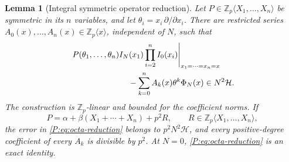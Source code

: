 \documentclass[11pt,a4paper]{article}
\newtheorem{lemma}[theorem]{Lemma}
\theoremstyle{definition}\newtheorem{definition}[theorem]{Definition}
\theoremstyle{remark}\newtheorem{remark}[theorem]{Remark}
\numberwithin{equation}{section}
\begin{document}
\begin{lemma}[Integral symmetric operator reduction]
\label{P:lem:octa-symmetric-reduction}
Let
\(P\in\mathbb Z_p\langle X_1,\ldots,X_n\rangle\)
be symmetric in its \(n\) variables, and let
\(\theta_i=x_i\,\partial/\partial x_i\).
There are restricted series
\(A_0(x),\ldots,A_n(x)\in\mathbb Z_p\langle x\rangle\),
independent of \(N\), such that
\begin{align}\label{P:eq:octa-reduction}
 &\left.
 P(\theta_1,\ldots,\theta_n)
 I_N(x_1)\prod_{i=2}^n I_0(x_i)
 \right|_{x_1=\cdots=x_n=x}
 \nonumber\\
 &\hspace{25mm}
 -\sum_{k=0}^n A_k(x)\theta^k\Phi_N(x)
 \in N^2\mathcal H.
\end{align}
The construction is \(\mathbb Z_p\)-linear and bounded for
the coefficient norms.  If
\[
 P=\alpha+\beta(X_1+\cdots+X_n)+p^2R,
 \qquad R\in\mathbb Z_p\langle X_1,\ldots,X_n\rangle,
\]
the error in \eqref{P:eq:octa-reduction} belongs to
\(p^2N^2\mathcal H\), and every positive-degree coefficient
of every \(A_k\) is divisible by \(p^2\).
At \(N=0\), \eqref{P:eq:octa-reduction} is an exact identity.
\end{lemma}
\end{document}
